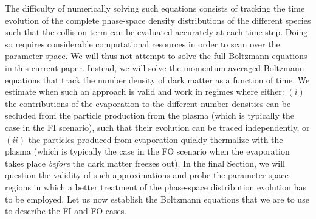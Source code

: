 \documentclass[aps,prd,reprint,twocolumn,preprintnumbers,floatfix,nofootinbib]{revtex4-1}
\begin{document}
The difficulty of numerically solving such equations consists of tracking the time evolution of the complete phase-space density distributions of the different species such that the collision term can be evaluated accurately at each time step. Doing so requires considerable computational resources in order to scan over the parameter space. We will thus not attempt to solve the full Boltzmann equations in this current paper. Instead, we will solve the momentum-averaged 
Boltzmann equations that track the number density of dark matter as a function of time. We estimate 
when such an approach is valid and work in regimes where either:
$(i)$ the contributions of the evaporation to the different number densities can be secluded from the particle production from the plasma (which is typically the case in the FI scenario), such that their evolution can be traced independently, or $(ii)$ the particles produced from evaporation quickly thermalize with the plasma (which is typically the case in the FO scenario when the evaporation takes place \emph{before} the dark matter freezes out). In the final Section, we will question the validity of such approximations and probe the parameter space regions in which a better treatment of the phase-space distribution evolution has to be employed. Let us now establish the Boltzmann equations that we are to use to describe the FI and FO cases.
\end{document}
